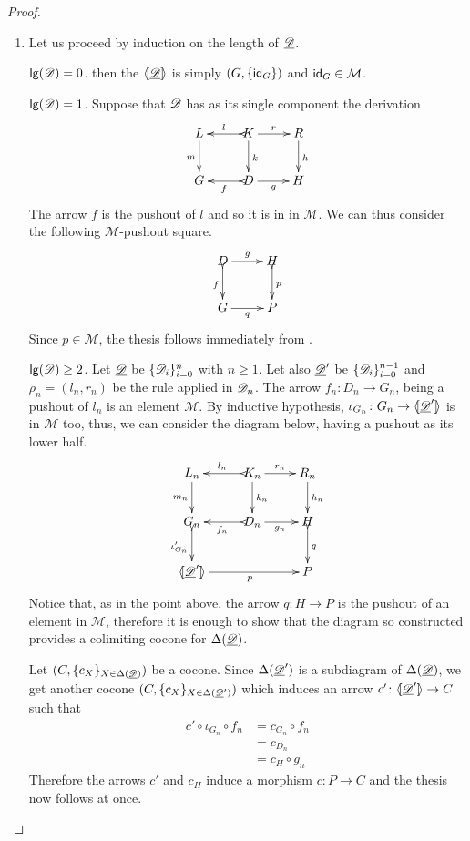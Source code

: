 \begin{proof}\begin{enumerate}
		\item Let us proceed by induction on the length of $\underline{\mathscr{D}}$.

	
	\smallskip \noindent $\mathsf{lg}(\mathscr{D})=0$. then the $\langle \hspace{-1.85pt}[ \underline{\mathscr{\mathscr{D}}}]\hspace{-1.85pt}\rangle$ is simply $(G, \{\mathsf{id}_{G}\})$ and $\mathsf{id}_{G}\in \mathcal{M}$.
	
	\smallskip \noindent$\mathsf{lg}(\mathscr{D})=1$. Suppose that $\mathscr{D}$ has as its single component the derivation
			\[\xymatrix{L \ar[d]_{m}& K \ar[d]^{k}\ar@{>->}[l]_{l} \ar[r]^{r} & R \ar[d]^{h} \\G& \ar@{>->}[l]^{f} D \ar[r]_{g}& H  \\}\]
			The arrow $f$ is  the pushout of $l$ and so it is in in $\mathcal{M}$. We can thus consider the following $\mathcal{M}$-pushout square.
			\[\xymatrix{D \ar@{>->}[d]_{f} \ar[r]^{g} & H \ar@{>->}[d]^{p} \\G \ar[r]_{q}& P }\]
			Since $p\in \mathcal{M}$, the thesis follows immediately from . 
	
	\smallskip \noindent$\mathsf{lg}(\mathscr{D})\geq 2$. Let $\underline{\mathscr{D}}$ be $\{\mathscr{D}_i\}_{i=0}^n$ with $n\geq 1$. Let also $\underline{\mathscr{D}}'$ be $\{\mathscr{D}_i\}^{n-1}_{i=0}$ and $\rho_n=(l_n, r_n)$ be the rule applied in $\mathscr{D}_n$. The arrow $f_n\colon D_n\to G_n$, being a pushout of $l_n$ is an element $\mathcal{M}$. By inductive hypothesis, $\iota_{G_{n}}\colon G_{n}\to \langle \hspace{-1.85pt}[ \underline{\mathscr{D}}']\hspace{-1.85pt}\rangle$ is in $\mathcal{M}$ too, thus, we can consider the diagram below, having a pushout as its lower half.
			\[\xymatrix{L_n \ar[d]_{m_{n}}& K_{n} \ar[d]^{k_{n}}\ar@{>->}[l]_{l_{n}} \ar[r]^{r_{n}} & R_{n} \ar[d]^{h_n} \\G_{n} \ar@{>->}[d]_{\iota'_{G_{n}}}& \ar@{>->}[l]^{f_n} D_n \ar[r]_{g_n}& H  \ar@{>->}[d]^{q}\\ \lpro \der{D}' \ar[rr]_{p}\rpro && P}\] 
			Notice that, as in the point above, the arrow $q\colon H\to P$ is the pushout of an element in $\mathcal{M}$, therefore it is enough to show that the diagram so constructed provides a colimiting cocone for $\Delta(\underline{\mathscr{D}})$.
			
			Let $(C, \{c_X\}_{X\in \Delta(\underline{\mathscr{D}})})$ be a cocone. Since $\Delta(\underline{\mathscr{D}}')$ is a subdiagram of $\Delta(\underline{\mathscr{D}})$, we get another cocone $(C, \{c_X\}_{X\in \Delta(\underline{\mathscr{D}}')})$ which induces an arrow $c'\colon \langle \hspace{-1.85pt}[ \underline{\mathscr{D}}' ]\hspace{-1.85pt}\rangle \to C$ such that
			\begin{align*}
				c'\circ \iota_{G_n} \circ f_n &=c_{G_n} \circ f_n\\&= c_{D_n}\\&= c_{H}\circ g_n
			\end{align*}
			Therefore the arrows $c'$ and $c_H$ induce a morphism $c\colon P\to C$ and the thesis now follows at once.
		

\end{enumerate}
\end{proof}
